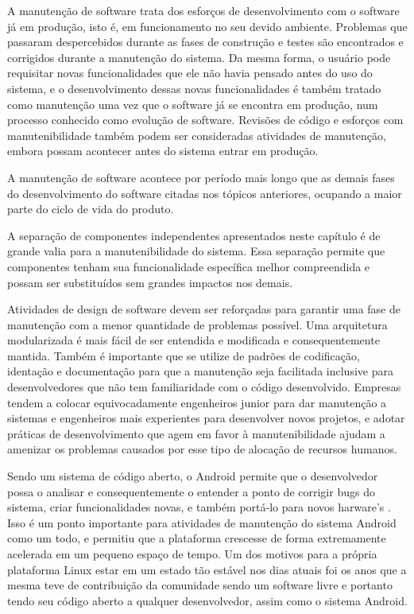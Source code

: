 A manutenção de software trata dos esforços de desenvolvimento com o software já em produção, isto é, em funcionamento no seu devido ambiente. Problemas que passaram despercebidos durante as fases de construção e testes são encontrados e corrigidos durante a manutenção do sistema. Da mesma forma, o usuário pode requisitar novas funcionalidades que ele não havia pensado antes do uso do sistema, e o desenvolvimento dessas novas funcionalidades é também tratado como manutenção uma vez que o software já se encontra em produção, num processo conhecido como evolução de software. Revisões de código e esforços com manutenibilidade também podem ser consideradas atividades de manutenção, embora possam acontecer antes do sistema entrar em produção.

A manutenção de software acontece por período mais longo que as demais fases do desenvolvimento do software citadas nos tópicos anteriores, ocupando a maior parte do ciclo de vida do produto.

A separação de componentes independentes apresentados neste capítulo é de grande valia para a manutenibilidade do sistema. Essa separação permite que componentes tenham sua funcionalidade específica melhor compreendida e possam ser substituídos sem grandes impactos nos demais. 

Atividades de design de software devem ser reforçadas para garantir uma fase de manutenção com a menor quantidade de problemas possível. Uma arquitetura modularizada é mais fácil de ser entendida e modificada e consequentemente mantida. Também é importante que se utilize de padrões de codificação, identação e documentação para que a manutenção seja facilitada inclusive para desenvolvedores que não tem familiaridade com o código desenvolvido. Empresas tendem a colocar equivocadamente engenheiros junior para dar manutenção a sistemas e engenheiros mais experientes para desenvolver novos projetos, e adotar práticas de desenvolvimento que agem em favor à manutenibilidade ajudam a amenizar os problemas causados por esse tipo de alocação de recursos humanos.

Sendo um sistema de código aberto, o Android permite que o desenvolvedor possa o analisar e consequentemente o entender a ponto de corrigir bugs do sistema, criar funcionalidades novas, e também portá-lo para novos harware's \cite{googleandroid}. Isso é um ponto importante para atividades de manutenção do sistema Android como um todo, e permitiu que a plataforma crescesse de forma extremamente acelerada em um pequeno espaço de tempo. Um dos motivos para a própria plataforma Linux estar em um estado tão estável nos dias atuais foi os anos que a mesma teve de contribuição da comunidade sendo um software livre e portanto tendo seu código aberto a qualquer desenvolvedor, assim como o sistema Android. 